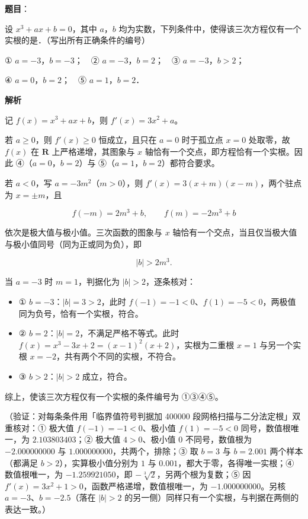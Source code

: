 \begin{answer}

\textbf{题目}：

设 \(x^3+ax+b=0\)，其中 \(a\)，\(b\) 均为实数，下列条件中，使得该三次方程仅有一个实根的是\gkblank{}．（写出所有正确条件的编号）

① \(a=-3\)，\(b=-3\)；　② \(a=-3\)，\(b=2\)；　③ \(a=-3\)，\(b>2\)；

④ \(a=0\)，\(b=2\)；　⑤ \(a=1\)，\(b=2\)．

\textbf{解析}

记 \(f(x)=x^3+ax+b\)，则 \(f'(x)=3x^2+a\)。

若 \(a\geqslant 0\)，则 \(f'(x)\geqslant 0\) 恒成立，且只在 \(a=0\) 时于孤立点 \(x=0\) 处取零，故 \(f(x)\) 在 \(\mathbf{R}\) 上严格递增，其图象与 \(x\) 轴恰有一个交点，即方程恰有一个实根。因此 ④（\(a=0\)，\(b=2\)）与 ⑤（\(a=1\)，\(b=2\)）都符合要求。

若 \(a<0\)，写 \(a=-3m^2\)（\(m>0\)），则 \(f'(x)=3(x+m)(x-m)\)，两个驻点为 \(x=\pm m\)，且

\nopagebreak[4]
\[
f(-m)=2m^3+b,\qquad f(m)=-2m^3+b
\]

依次是极大值与极小值。三次函数的图象与 \(x\) 轴恰有一个交点，当且仅当极大值与极小值同号（同为正或同为负），即

\nopagebreak[4]
\[
|b|>2m^3 .
\]

当 \(a=-3\) 时 \(m=1\)，判据化为 \(|b|>2\)，逐条核对：

\begin{itemize}
\item ① \(b=-3\)：\(|b|=3>2\)，此时 \(f(-1)=-1<0\)、\(f(1)=-5<0\)，两极值同为负号，恰有一个实根，符合。
\item ② \(b=2\)：\(|b|=2\)，不满足严格不等式。此时 \(f(x)=x^3-3x+2=(x-1)^2(x+2)\)，实根为二重根 \(x=1\) 与另一个实根 \(x=-2\)，共有两个不同的实根，不符合。
\item ③ \(b>2\)：\(|b|>2\) 成立，符合。
\end{itemize}

综上，使该三次方程仅有一个实根的条件编号为 ①③④⑤。

（验证：对每条条件用「临界值符号判据加 400000 段网格扫描与二分法定根」双重核对：① 极大值 \(f(-1)=-1<0\)、极小值 \(f(1)=-5<0\) 同号，数值根唯一，为 \(2.103803403\)；② 极大值 \(4>0\)、极小值 \(0\) 不同号，数值根为 \(-2.000000000\) 与 \(1.000000000\)，共两个，排除；③ 取 \(b=3\) 与 \(b=2.001\) 两个样本（都满足 \(b>2\)），实算极小值分别为 \(1\) 与 \(0.001\)，都大于零，各得唯一实根；④ 数值根唯一，为 \(-1.259921050\)，即 \(-\sqrt[3]{2}\)，另两个根为复数；⑤ 因 \(f'(x)=3x^2+1>0\)，函数严格递增，数值根唯一，为 \(-1.000000000\)。另核 \(a=-3\)、\(b=-2.5\)（落在 \(|b|>2\) 的另一侧）同样只有一个实根，与判据在两侧的表达一致。）


\end{answer}
